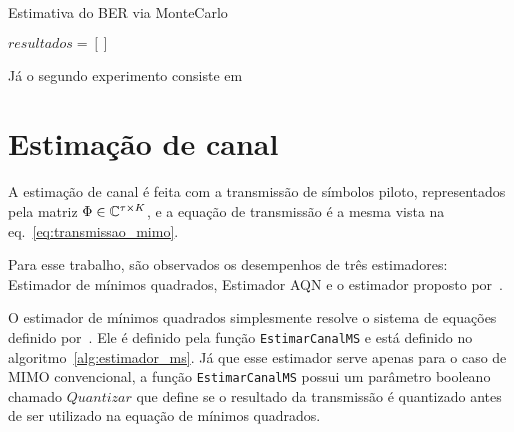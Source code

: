 \documentclass{article}
\begin{document}
\begin{algorithm}
    \label{alg:ber_snr}
    \caption{Estimativa do BER via MonteCarlo}
    $resultados = []$
\end{algorithm}

Já o segundo experimento consiste em 

\section{Estimação de canal}
\label{sec:estimacao_canal}

A estimação de canal é feita com a transmissão de símbolos piloto, representados pela matriz $\Phi\in\mathbb{C}^{\tau\times K}$, e a equação de transmissão é a mesma vista na eq.~\eqref{eq:transmissao_mimo}. 

Para esse trabalho, são observados os desempenhos de três estimadores: Estimador de mínimos quadrados, Estimador AQN e o estimador proposto por~\cite{li.etal_2017a}. 

O estimador de mínimos quadrados simplesmente resolve o sistema de equações definido por~\cite[eq. 4]{li.etal_2017a}. Ele é definido pela função \texttt{EstimarCanalMS} e está definido no algoritmo~\ref{alg:estimador_ms}. Já que esse estimador serve apenas para o caso de MIMO convencional, a função \texttt{EstimarCanalMS} possui um parâmetro booleano chamado $Quantizar$ que define se o resultado da transmissão é quantizado antes de ser utilizado na equação de mínimos quadrados. 
\end{document}

